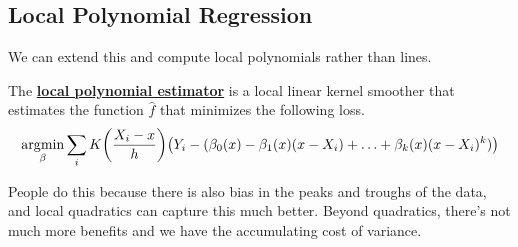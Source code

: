 \subsection{Local Polynomial Regression}

  We can extend this and compute local polynomials rather than lines. 

  \begin{definition}
    \label{def:local-polynomial-estimator-2}
    The \textbf{\hyperref[def:local-polynomial-estimator]{local polynomial estimator}} is a local linear kernel smoother that estimates the function $\hat{f}$ that minimizes the following loss. 
    \begin{equation}
      \operatorname*{\arg\!\min}_{\beta} \sum_i K \bigg( \frac{X_i - x}{h} \bigg) \big( Y_i - (\beta_0 (x) - \beta_1 (x) (x- X_i) + \ldots + \beta_k (x) (x - X_i)^k )\big)
    \end{equation}
  \end{definition}

  People do this because there is also bias in the peaks and troughs of the data, and local quadratics can capture this much better. Beyond quadratics, there's not much more benefits and we have the accumulating cost of variance. 
